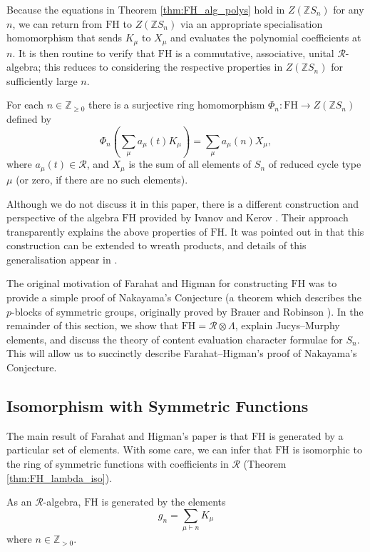 \documentclass[ALCO,Unicode]{cedram}
\newcommand{\FH}{\mathrm{FH}}
\newcommand{\FH}{\mathrm{FH}}
\begin{document}
Because the equations in Theorem \ref{thm:FH_alg_polys} hold in $Z(\mathbb{Z}S_n)$ for any $n$, we can return from $\FH$ to $Z(\mathbb{Z}S_n)$ via an appropriate specialisation homomorphism that sends $K_\mu$ to $X_\mu$ and evaluates the polynomial coefficients at $n$. It is then routine to verify that $\FH$ is a commutative, associative, unital $\mathcal{R}$-algebra; this reduces to considering the respective properties in $Z(\mathbb{Z}S_n)$ for sufficiently large $n$. 

\begin{theorem} \label{thm:FH_spec_hom}
For each $n \in \mathbb{Z}_{\geq 0}$ there is a surjective ring homomorphism $\Phi_n: \FH \to Z(\mathbb{Z}S_n)$ defined by
\[
\Phi_n \left( \sum_{\mu} a_\mu(t) K_\mu \right) = \sum_{\mu} a_\mu(n) X_\mu,
\]
where $a_\mu(t) \in \mathcal{R}$, and $X_\mu$ is the sum of all elements of $S_n$ of reduced cycle type $\mu$ \textup{(}or zero, if there are no such elements\textup{)}.
\end{theorem}
\begin{remark}
Although we do not discuss it in this paper, there is a different construction and perspective of the algebra $\FH$ provided by Ivanov and Kerov \cite{IvanovKerov}. Their approach transparently explains the above properties of $\FH$. It was pointed out in \cite{Wang2} that this construction can be extended to wreath products, and details of this generalisation appear in \cite{Tout}.
\end{remark}

The original motivation of Farahat and Higman for constructing $\FH$ was to provide a simple proof of Nakayama's Conjecture (a theorem which describes the $p$-blocks of symmetric groups, originally proved by Brauer and Robinson \cite{BrauerRobinson}). In the remainder of this section, we show that $\FH = \mathcal{R} \otimes \Lambda$, explain Jucys--Murphy elements, and discuss the theory of content evaluation character formulae for $S_n$. This will allow us to succinctly describe Farahat--Higman's proof of Nakayama's Conjecture.

\subsection{Isomorphism with Symmetric Functions}
The main result of Farahat and Higman's paper is that $\FH$ is generated by a particular set of elements. With some care, we can infer that $\FH$ is isomorphic to the ring of symmetric functions with coefficients in $\mathcal{R}$ (Theorem \ref{thm:FH_lambda_iso}).
\begin{theorem} \label{thm:FH_generation_thm}
As an $\mathcal{R}$-algebra, $\FH$ is generated by the elements
\[
g_n = \sum_{\mu \vdash n} K_\mu
\]
where $n \in \mathbb{Z}_{>0}$.
\end{theorem}
\end{document}
